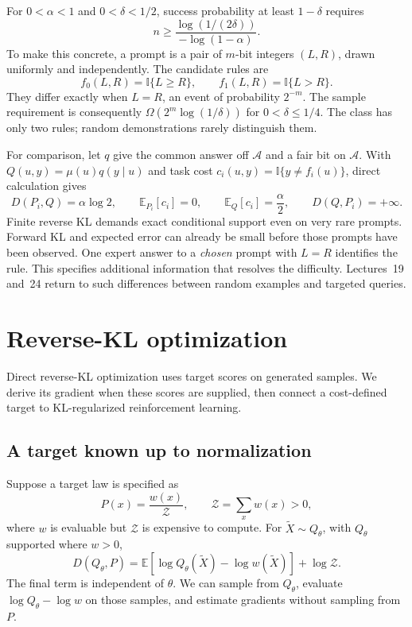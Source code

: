 \documentclass[11pt,twoside]{article}
\newcommand{\E}{\mathbb E}
\newcommand{\I}{\mathbb I}
\newcommand{\KL}{D}
\theoremstyle{definition}
\theoremstyle{remark}
\begin{document}
For \(0<\alpha<1\) and \(0<\delta<1/2\), success probability at least
\(1-\delta\) requires
\[
 n\ge\frac{\log(1/(2\delta))}{-\log(1-\alpha)}.
\]
To make this concrete, a prompt is a pair of \(m\)-bit integers
\((L,R)\), drawn uniformly and independently. The candidate rules are
\[
 f_0(L,R)=\I\{L\ge R\},\qquad f_1(L,R)=\I\{L>R\}.
\]
They differ exactly when \(L=R\), an event of probability \(2^{-m}\).
The sample requirement is consequently
\(\Omega(2^m\log(1/\delta))\) for \(0<\delta\le1/4\).
The class has only two rules; random demonstrations rarely distinguish
them.

For comparison, let \(q\) give the common answer off \(\mathcal A\)
and a fair bit on \(\mathcal A\). With \(Q(u,y)=\mu(u)q(y\mid u)\)
and task cost \(c_i(u,y)=\I\{y\ne f_i(u)\}\), direct calculation gives
\[
 \KL(P_i, Q)=\alpha\log2,\qquad
 \E_{P_i}[c_i]=0,\qquad
 \E_Q[c_i]=\frac\alpha2,\qquad
 \KL(Q, P_i)=+\infty.
\]
Finite reverse KL demands exact conditional support even on very rare
prompts. Forward KL and expected error can already be small before those
prompts have been observed.
One expert answer to a \emph{chosen} prompt with \(L=R\) identifies the
rule. This specifies additional information that resolves the difficulty.
Lectures~19 and~24 return to such differences between random examples
and targeted queries.

\clearpage
\section{Reverse-KL optimization}
\label{app:reverse-optimization}

Direct reverse-KL optimization uses target scores on generated samples.
We derive its gradient when these scores are supplied, then connect a
cost-defined target to KL-regularized reinforcement learning.

\subsection{A target known up to normalization}

Suppose a target law is specified as
\[
 P(x)=\frac{w(x)}{\mathcal Z},\qquad
 \mathcal Z=\sum_x w(x)>0,
\]
where \(w\) is evaluable but \(\mathcal Z\) is expensive to compute.
For \(\widetilde X\sim Q_\theta\), with \(Q_\theta\) supported where
\(w>0\),
\begin{equation}
 \KL(Q_\theta, P)
 =\E[\log Q_\theta(\widetilde X)-\log w(\widetilde X)]
   +\log\mathcal Z.
 \label{eq:unnormalized-target}
\end{equation}
The final term is independent of \(\theta\). We can sample from
\(Q_\theta\), evaluate \(\log Q_\theta-\log w\) on those samples,
and estimate gradients without sampling from \(P\).
\end{document}
